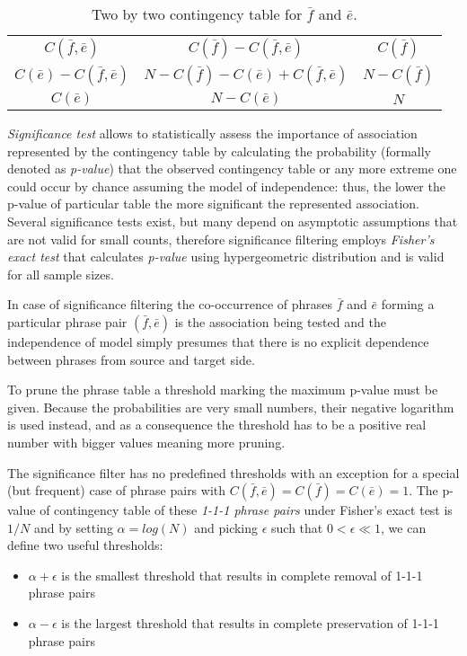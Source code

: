 \begin{table}[ht]
\centering
\def\arraystretch{1.5}
\begin{tabular}{ | c c | c | }
\hline
$C(\bar{f},\bar{e})$  &  $C(\bar{f}) - C(\bar{f},\bar{e})$  &  $C(\bar{f})$ \\
$C(\bar{e}) - C(\bar{f},\bar{e})$  &  $N - C(\bar{f}) - C(\bar{e}) + C(\bar{f},\bar{e})$  & $N - C(\bar{f})$ \\
\hline
$C(\bar{e})$  &  $N - C(\bar{e})$  &  $N$ \\
\hline
\end{tabular}
\caption{\label{two-by-two-contingency-table}
Two by two contingency table for $\bar{f}$ and $\bar{e}$.}
\end{table}

\emph{Significance test} allows to statistically assess the importance of association
represented by the contingency table by calculating the probability (formally denoted
as \emph{p-value}) that the observed contingency table or any more extreme one could
occur by chance assuming the model of independence: thus, the lower the p-value of
particular table the more significant the represented association.
Several significance tests exist, but many depend on asymptotic assumptions
that are not valid for small counts, therefore significance filtering employs
\emph{Fisher's exact test} that calculates \emph{p-value} using hypergeometric
distribution and is valid for all sample sizes.

In case of significance filtering the co-occurrence of phrases $\bar{f}$ and $\bar{e}$
forming a particular phrase pair $(\bar{f},\bar{e})$ is the association being tested
and the independence of model simply presumes that there is no explicit dependence
between phrases from source and target side.

To prune the phrase table a threshold marking the maximum p-value must be given.
Because the probabilities are very small numbers, their negative logarithm is used
instead, and as a consequence the threshold has to be a positive real number with
bigger values meaning more pruning.

The significance filter has no predefined thresholds with an exception for a special
(but frequent) case of phrase pairs with $C(\bar{f},\bar{e}) = C(\bar{f}) = C(\bar{e}) = 1$.
The p-value of contingency table of these \emph{1-1-1 phrase pairs} under Fisher's
exact test is $1/N$ and by setting $\alpha = log(N)$ and picking $\epsilon$ such that
$0 < \epsilon \ll 1$, we can define two useful thresholds:
\begin{itemize}
  \item $\alpha + \epsilon$ is the smallest threshold that results in complete removal
    of 1-1-1 phrase pairs
  \item $\alpha - \epsilon$ is the largest threshold that results in complete preservation
    of 1-1-1 phrase pairs
\end{itemize}

